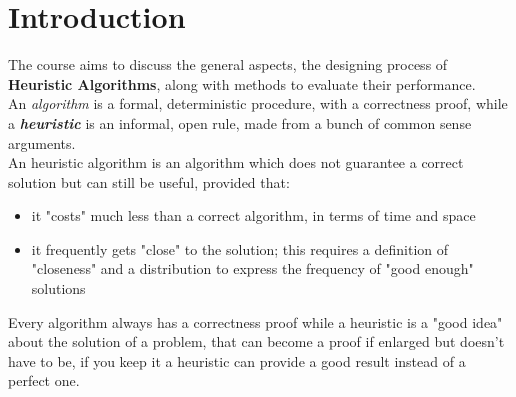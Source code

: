 \documentclass[11pt]{article}
\begin{document}
	\initcurrdate
	\maketitle 									%
	\newcommand{\nn}{\hfill \\}
	
	\tableofcontents
	\newpage
	
	\section*{Introduction}
	
	The course aims to discuss the general aspects, the designing process of \textbf{Heuristic Algorithms}, along with methods to evaluate their performance.\\
	
	An \textit{algorithm} is a formal, deterministic procedure, with a correctness proof, while a \textbf{\textit{heuristic}} is an informal, open rule, made from a bunch of common sense arguments.\\
	An heuristic algorithm is an algorithm which does not guarantee a correct solution but can still be useful, provided that: 
	\begin{itemize}
		\item it "costs" much less than a correct algorithm, in terms of time and space
		\item it frequently gets "close" to the solution; this requires a definition of "closeness" and a distribution to express the frequency of "good enough" solutions
	\end{itemize}
	Every algorithm always has a correctness proof while a heuristic is a "good idea" about the solution of a problem, that can become a proof if enlarged but doesn't have to be, if you keep it a heuristic can provide a good result instead of a perfect one.\\
	
\end{document}
